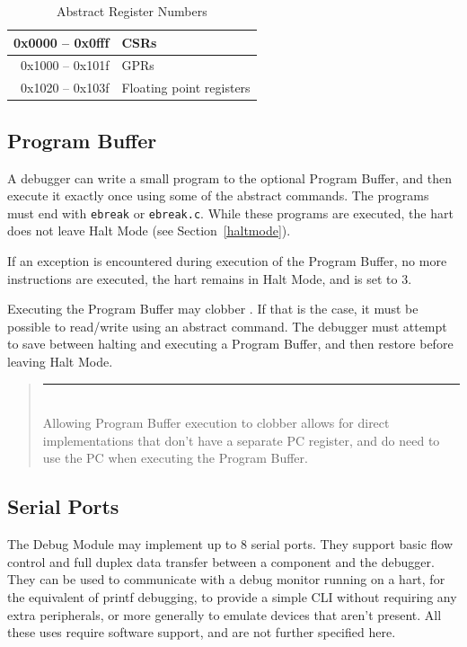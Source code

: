 \documentclass{article}
\newenvironment{commentary}
{
   \begin{quotation}
   \noindent
   \small \em
   \rule{\linewidth}{1pt}\\
}
{
   \end{quotation}
}
\begin{document}
\begin{table}[htp]
    \centering
    \caption{Abstract Register Numbers}
    \label{tab:regno}
    \begin{tabulary}{\textwidth}{|r|l|}
        \hline
        0x0000 -- 0x0fff & CSRs \\
        \hline
        0x1000 -- 0x101f & GPRs \\
        \hline
        0x1020 -- 0x103f & Floating point registers \\
        \hline
    \end{tabulary}
\end{table}



\subsection{Program Buffer}

A debugger can write a small program to the optional Program Buffer, and then
execute it exactly once using some of the abstract commands. The programs must
end with {\tt ebreak} or {\tt ebreak.c}. While these programs are executed, the
hart does not leave Halt Mode (see Section~\ref{haltmode}).

If an exception is encountered during execution of the Program Buffer, no more
instructions are executed, the hart remains in Halt Mode, and \Fcmderr is set
to 3.

Executing the Program Buffer may clobber \Rdpc. If that is the case, it must be
possible to read/write \Rdpc using an abstract command. The debugger must
attempt to save \Rdpc between halting and executing a Program Buffer, and then
restore \Rdpc before leaving Halt Mode.

\begin{commentary}
    Allowing Program Buffer execution to clobber \Rdpc allows for direct
    implementations that don't have a separate PC register, and do need to use
    the PC when executing the Program Buffer.
\end{commentary}

\subsection{Serial Ports}

The Debug Module may implement up to 8 serial ports. They support basic flow
control and full duplex data transfer between a component and the debugger.
They can be used to communicate with a debug monitor running on a hart, for the
equivalent of printf debugging, to provide a simple CLI without requiring any
extra peripherals, or more generally to emulate devices that aren't present.
All these uses require software support, and are not further specified here.
\end{document}
